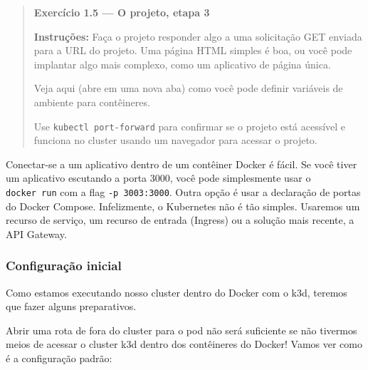 \documentclass[
]{article}
\newenvironment{Shaded}{}{}
\newcommand{\ExtensionTok}[1]{#1}
\newcommand{\NormalTok}[1]{#1}
\newcommand{\OperatorTok}[1]{\textcolor[rgb]{0.40,0.40,0.40}{#1}}
\newcommand{\StringTok}[1]{\textcolor[rgb]{0.25,0.44,0.63}{#1}}
\begin{document}
\begin{quote}
\textbf{Exercício 1.5 --- O projeto, etapa 3}

\textbf{Instruções:} Faça o projeto responder algo a uma solicitação GET
enviada para a URL do projeto. Uma página HTML simples é boa, ou você
pode implantar algo mais complexo, como um aplicativo de página única.

Veja aqui (abre em uma nova aba) como você pode definir variáveis de
ambiente para contêineres.

Use \texttt{kubectl\ port-forward} para confirmar se o projeto está
acessível e funciona no cluster usando um navegador para acessar o
projeto.
\end{quote}

Conectar-se a um aplicativo dentro de um contêiner Docker é fácil. Se
você tiver um aplicativo escutando a porta 3000, você pode simplesmente
usar o \texttt{docker\ run} com a flag \texttt{-p\ 3003:3000}. Outra
opção é usar a declaração de portas do Docker Compose. Infelizmente, o
Kubernetes não é tão simples. Usaremos um recurso de serviço, um recurso
de entrada (Ingress) ou a solução mais recente, a API Gateway.

\subsubsection{Configuração inicial}\label{configurauxe7uxe3o-inicial}

Como estamos executando nosso cluster dentro do Docker com o k3d,
teremos que fazer alguns preparativos.

Abrir uma rota de fora do cluster para o pod não será suficiente se não
tivermos meios de acessar o cluster k3d dentro dos contêineres do
Docker! Vamos ver como é a configuração padrão:

\begin{Shaded}
\end{Shaded}
\end{document}
